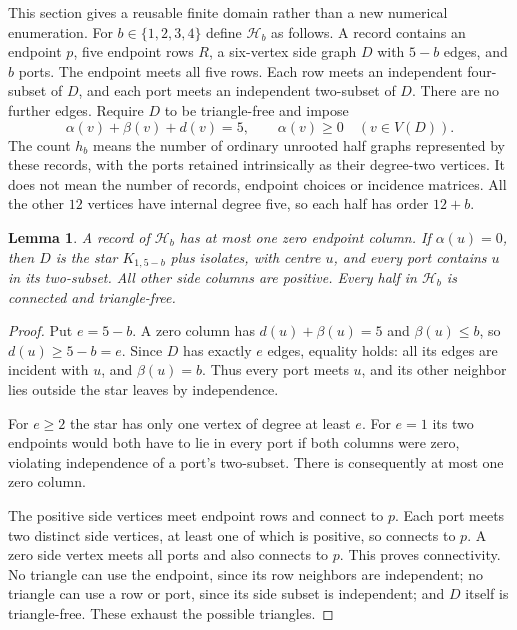\documentclass[11pt]{article}
\newtheorem{lemma}[theorem]{Lemma}
\begin{document}
This section gives a reusable finite domain rather than a new numerical
enumeration. For $b\in\{1,2,3,4\}$ define $\mathcal H_b$ as follows.
A record contains an endpoint $p$, five endpoint rows $R$, a six-vertex
side graph $D$ with $5-b$ edges, and $b$ ports. The endpoint meets all
five rows. Each row meets an independent four-subset of $D$, and each
port meets an independent two-subset of $D$. There are no further edges.
Require $D$ to be triangle-free and impose
\begin{equation}\label{hbmargin}
 \alpha(v)+\beta(v)+d(v)=5,\qquad\alpha(v)\geq0
 \quad(v\in V(D)).
\end{equation}
The count $h_b$ means the number of ordinary unrooted half graphs
represented by these records, with the ports retained intrinsically
as their degree-two vertices. It does not mean the number of records,
endpoint choices or incidence matrices. All the other $12$ vertices
have internal degree five, so each half has order $12+b$.

\begin{lemma}\label{zerob}
A record of $\mathcal H_b$ has at most one zero endpoint column.
If $\alpha(u)=0$, then $D$ is the star $K_{1,5-b}$ plus isolates,
with centre $u$, and every port contains $u$ in its two-subset.
All other side columns are positive. Every half in $\mathcal H_b$
is connected and triangle-free.
\end{lemma}
\begin{proof}
Put $e=5-b$. A zero column has $d(u)+\beta(u)=5$ and
$\beta(u)\leq b$, so $d(u)\geq5-b=e$. Since $D$ has exactly $e$
edges, equality holds: all its edges are incident with $u$, and
$\beta(u)=b$. Thus every port meets $u$, and its other neighbor lies
outside the star leaves by independence.

For $e\geq2$ the star has only one vertex of degree at least $e$.
For $e=1$ its two endpoints would both have to lie in every port if
both columns were zero, violating independence of a port's two-subset.
There is consequently at most one zero column.

The positive side vertices meet endpoint rows and connect to $p$.
Each port meets two distinct side vertices, at least one of which is
positive, so connects to $p$. A zero side vertex meets all ports and
also connects to $p$. This proves connectivity. No triangle can use
the endpoint, since its row neighbors are independent; no triangle
can use a row or port, since its side subset is independent; and $D$
itself is triangle-free. These exhaust the possible triangles.
\end{proof}
\end{document}
